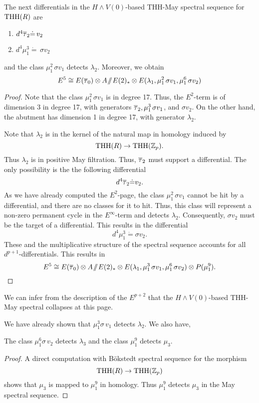 \begin{prop}
	The next differentials in the $H\wedge V(0)$-based THH-May spectral sequence for $\operatorname{THH}(R)$ are 
	\begin{enumerate}
		\item $d^{4}\overline{\tau}_2\dot{=}\, v_2$
		\item $d^{4}\mu_1^3\dot{=}\, \sigma v_2$
	\end{enumerate}
	and the class $\mu_1^2\, \sigma v_1$ detects $\lambda_2$. Moreover, we obtain
	\[
	E^{5}\cong E(\overline{\tau}_0)\otimes A\! \sslash \! E(2)_*\otimes E(\lambda_1, \mu_1^2\, \sigma v_1, \mu_1^6\, \sigma v_2)
	\]
\end{prop}
\begin{proof}
	Note that the class $\mu_1^2\, \sigma v_1$ is in degree 17. Thus, the $E^2$-term is of dimension 3 in degree 17, with generators $\overline{\tau}_2, \mu_1^3\, \sigma v_1$, and $\sigma v_2$. On the other hand, the abutment has dimension 1 in degree 17, with generator $\lambda_2$. 

Note that $\lambda_2$ is in the kernel of the natural map in homology induced by 
\[
\operatorname{THH}(R)\to \operatorname{THH}(\mathbb{Z}_p).
\]
Thus $\lambda_2$ is in positive May filtration. Thus, $\overline{\tau}_2$ must support a differential. The only possibility is the the following differential
\[
d^{4}\overline{\tau}_2 \dot{=} v_2.
\]
As we have already computed the $E^2$-page, the class $\mu_1^2\, \sigma v_1$ cannot be hit by a differential, and there are no classes for it to hit. Thus, this class will represent a non-zero permanent cycle in the $E^\infty$-term and detects $\lambda_2$. Consequently, $\sigma v_2$ must be the target of a differential. This results in the differential 
\[
d^{4}\mu_1^3\dot{=} \sigma v_2.
\] 
These and the multiplicative structure of the spectral sequence accounts for all $d^{p+1}$-differentials. This results in 
\[
E^{5}\cong E(\overline{\tau}_0)\otimes A\! \sslash \! E(2)_*\otimes E(\lambda_1, \mu_1^3\, \sigma v_1, \mu_1^6\, \sigma v_2 )\otimes P(\mu_1^9).
\]
\end{proof}

We can infer from the description of the $E^{p+2}$ that the $H\wedge V(0)$-based THH-May spectral collapses at this page. 


We have already shown that $\mu_1^3\sigma\, v_1$ detects $\lambda_2$. We also have, 
\begin{prop}
	The class $\mu_1^6\sigma\, v_2$ detects $\lambda_3$ and the class $\mu_1^9$ detects $\mu_3$.
\end{prop}
\begin{proof}
	A direct computation with B\"okstedt spectral sequence for the morphism
	\[
	\operatorname{THH}(R)\to \operatorname{THH}(\mathbb{Z}_p)
	\]
	shows that $\mu_3$ is mapped to $\mu_1^9$ in homology. Thus $\mu_1^9$ detects $\mu_3$ in the May spectral sequence. 
\end{proof}

